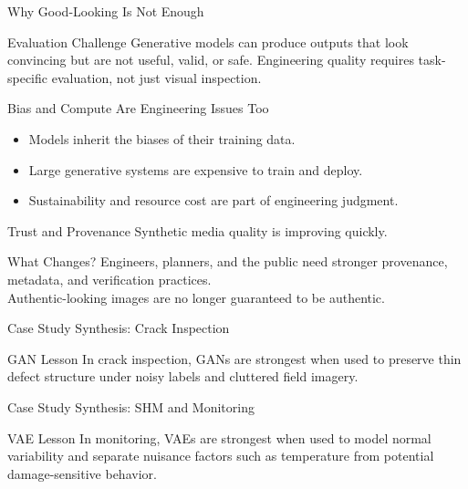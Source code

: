 \documentclass[12pt]{beamer}
\begin{document}
\begin{frame}{Why Good-Looking Is Not Enough}
  \begin{warningbox}{Evaluation Challenge}
    Generative models can produce outputs that look convincing but are not useful, valid, or safe. Engineering quality requires task-specific evaluation, not just visual inspection.
  \end{warningbox}
\end{frame}

\begin{frame}{Bias and Compute Are Engineering Issues Too}
  \begin{itemize}
    \item Models inherit the biases of their training data.
    \item Large generative systems are expensive to train and deploy.
    \item Sustainability and resource cost are part of engineering judgment.
  \end{itemize}
\end{frame}

\begin{frame}{Trust and Provenance}
  Synthetic media quality is improving quickly.

  \begin{conceptbox}{What Changes?}
    Engineers, planners, and the public need stronger provenance, metadata, and verification practices.
    \\
    Authentic-looking images are no longer guaranteed to be authentic.
  \end{conceptbox}
\end{frame}

\begin{frame}{Case Study Synthesis: Crack Inspection}
  \begin{examplebox}{GAN Lesson}
    In crack inspection, GANs are strongest when used to preserve thin defect structure under noisy labels and cluttered field imagery.
  \end{examplebox}
\end{frame}

\begin{frame}{Case Study Synthesis: SHM and Monitoring}
  \begin{examplebox}{VAE Lesson}
    In monitoring, VAEs are strongest when used to model normal variability and separate nuisance factors such as temperature from potential damage-sensitive behavior.
  \end{examplebox}
\end{frame}
\end{document}

